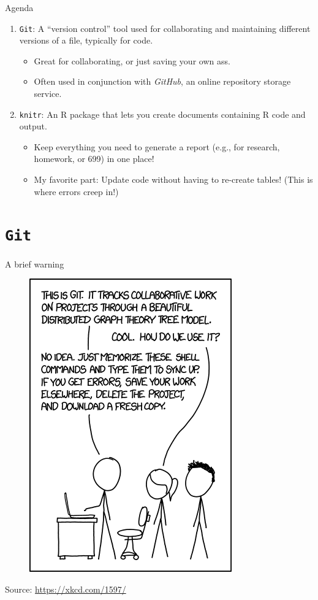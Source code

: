 \documentclass{beamer}\usepackage[]{graphicx}\usepackage[]{color}
\begin{document}
	\begin{frame}{Agenda}
		\begin{enumerate}
			\item \texttt{Git}: A ``version control'' tool used for collaborating and maintaining different versions of a file, typically for code.
			\begin{itemize}
				\item Great for collaborating, or just saving your own ass.
				\item Often used in conjunction with \textit{GitHub}, an online repository storage service.
			\end{itemize}

			\item \texttt{knitr}: An R package that lets you create documents containing R code and output.
			\begin{itemize}
				\item Keep everything you need to generate a report (e.g., for research, homework, or 699) in one place!
				\item My favorite part: Update code without having to re-create tables! (This is where errors creep in!)
			\end{itemize}
		\end{enumerate}
	\end{frame}
	
	\section{\texttt{Git}}
	
	\begin{frame}{A brief warning}

  \begin{figure}
			\centering
			\includegraphics[height=.75\textheight]{xkcd-git.png}
		\end{figure}
		\scriptsize{Source: \url{https://xkcd.com/1597/}}
	\end{frame}
	
\end{document}

